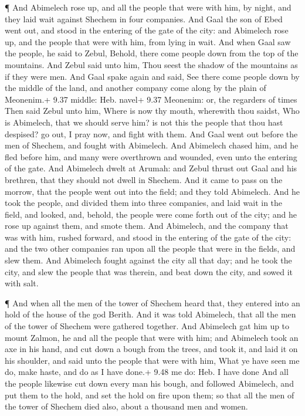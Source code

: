  ¶ And Abimelech rose up, and all the people that were with
him, by night, and they laid wait against Shechem in four companies.
 And Gaal the son of Ebed went out, and stood in the
entering of the gate of the city: and Abimelech rose up, and the people
that were with him, from lying in wait.  And when Gaal saw
the people, he said to Zebul, Behold, there come people down from the
top of the mountains. And Zebul said unto him, Thou seest the shadow of
the mountains as if they were men.  And Gaal spake again
and said, See there come people down by the middle of the land, and
another company come along by the plain of Meonenim.+ 9.37 middle: Heb.
navel+ 9.37 Meonenim: or, the regarders of times  Then said
Zebul unto him, Where is now thy mouth, wherewith thou saidst, Who is
Abimelech, that we should serve him? is not this the people that thou
hast despised? go out, I pray now, and fight with them. 
And Gaal went out before the men of Shechem, and fought with Abimelech.
 And Abimelech chased him, and he fled before him, and many
were overthrown and wounded, even unto the entering of the gate.
 And Abimelech dwelt at Arumah: and Zebul thrust out Gaal
and his brethren, that they should not dwell in Shechem. 
And it came to pass on the morrow, that the people went out into the
field; and they told Abimelech.  And he took the people,
and divided them into three companies, and laid wait in the field, and
looked, and, behold, the people were come forth out of the city; and he
rose up against them, and smote them.  And Abimelech, and
the company that was with him, rushed forward, and stood in the entering
of the gate of the city: and the two other companies ran upon all the
people that were in the fields, and slew them.  And
Abimelech fought against the city all that day; and he took the city,
and slew the people that was therein, and beat down the city, and sowed
it with salt.

 ¶ And when all the men of the tower of Shechem heard that,
they entered into an hold of the house of the god Berith. 
And it was told Abimelech, that all the men of the tower of Shechem were
gathered together.  And Abimelech gat him up to mount
Zalmon, he and all the people that were with him; and Abimelech took an
axe in his hand, and cut down a bough from the trees, and took it, and
laid it on his shoulder, and said unto the people that were with him,
What ye have seen me do, make haste, and do as I have done.+ 9.48 me do:
Heb. I have done  And all the people likewise cut down
every man his bough, and followed Abimelech, and put them to the hold,
and set the hold on fire upon them; so that all the men of the tower of
Shechem died also, about a thousand men and women.

